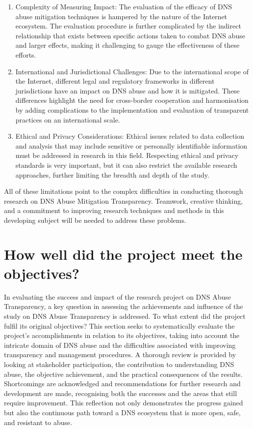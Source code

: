 \begin{enumerate}
    \item Complexity of Measuring Impact: The evaluation of the efficacy of DNS abuse mitigation techniques is hampered by the nature of the Internet ecosystem. The evaluation procedure is further complicated by the indirect relationship that exists between specific actions taken to combat DNS abuse and larger effects, making it challenging to gauge the effectiveness of these efforts.

    \item International and Jurisdictional Challenges: Due to the international scope of the Internet, different legal and regulatory frameworks in different jurisdictions have an impact on DNS abuse and how it is mitigated. These differences highlight the need for cross-border cooperation and harmonisation by adding complications to the implementation and evaluation of transparent practices on an international scale.

    \item Ethical and Privacy Considerations: Ethical issues related to data collection and analysis that may include sensitive or personally identifiable information must be addressed in research in this field. Respecting ethical and privacy standards is very important, but it can also restrict the available research approaches, further limiting the breadth and depth of the study.

    
  
\end{enumerate}

All of these limitations point to the complex difficulties in conducting thorough research on DNS Abuse Mitigation Transparency. Teamwork, creative thinking, and a commitment to improving research techniques and methods in this developing subject will be needed to address these problems.

\section{How well did the project meet the objectives?}

In evaluating the success and impact of the research project on DNS Abuse Transparency, a key question in assessing the achievements and influence of the study on DNS Abuse Transparency is addressed. To what extent did the project fulfil its original objectives? This section seeks to systematically evaluate the project's accomplishments in relation to its objectives, taking into account the intricate domain of DNS abuse and the difficulties associated with improving transparency and management procedures. A thorough review is provided by looking at stakeholder participation, the contribution to understanding DNS abuse, the objective achievement, and the practical consequences of the results. Shortcomings are acknowledged and recommendations for further research and development are made, recognising both the successes and the areas that still require improvement. This reflection not only demonstrates the progress gained but also the continuous path toward a DNS ecosystem that is more open, safe, and resistant to abuse.


